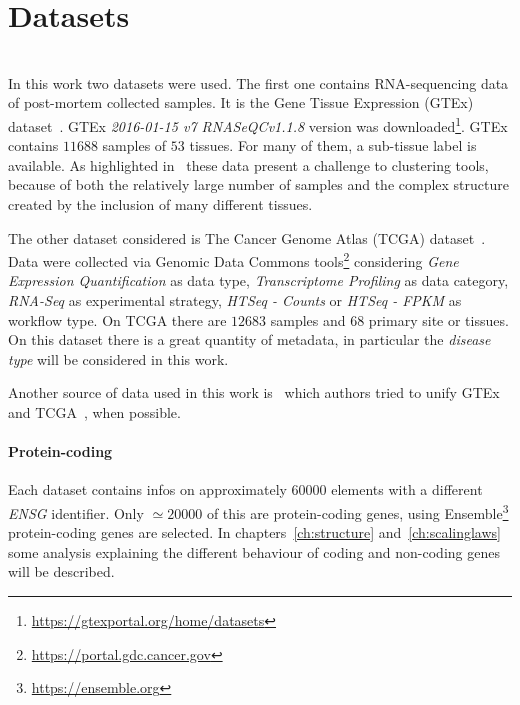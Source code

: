 \section{Datasets}\mbox{}\\
In this work two datasets were used. The first one contains RNA-sequencing data of post-mortem collected samples. It is the Gene Tissue Expression (GTEx) dataset~\cite{carithers2015novel}. GTEx \textit{2016-01-15 v7 RNASeQCv1.1.8} version was downloaded\footnote{\url{https://gtexportal.org/home/datasets}}.
GTEx contains $11688$ samples of $53$ tissues. For many of them, a sub-tissue label is available. As highlighted in~\cite{dey2017visualizing} these data present a challenge to clustering tools, because of both the relatively large number of samples and the complex structure created by the inclusion of many different tissues.

The other dataset considered is The Cancer Genome Atlas (TCGA) dataset~\cite{grossman2016toward}. Data were collected via Genomic Data Commons tools\footnote{\url{https://portal.gdc.cancer.gov}} considering \textit{Gene Expression Quantification} as data type, \textit{Transcriptome Profiling} as data category, \textit{RNA-Seq} as experimental strategy, \textit{HTSeq - Counts} or \textit{HTSeq - FPKM} as workflow type. On TCGA there are $12683$ samples and $68$ primary site or tissues. On this dataset there is a great quantity of metadata, in particular the \textit{disease type} will be considered in this work.

Another source of data used in this work is~\cite{Wang2017} which authors tried to unify GTEx and TCGA~\cite{Betel2018}, when possible.

\paragraph{Protein-coding}
Each dataset contains infos on approximately $60000$ elements with a different \textit{ENSG} identifier. Only $\simeq 20000$ of this are protein-coding genes, using Ensemble\footnote{\url{https://ensemble.org}} protein-coding genes are selected. In chapters~\ref{ch:structure} and~\ref{ch:scalinglaws} some analysis explaining the different behaviour of coding and non-coding genes will be described.